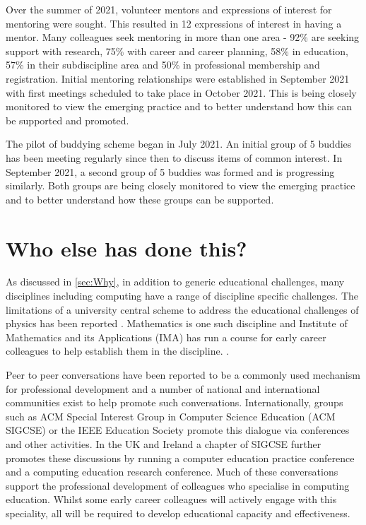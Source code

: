 \documentclass[sigconf]{acmart}
\begin{document}
Over the summer of 2021, volunteer mentors and expressions of interest for mentoring were sought. This resulted in 12 expressions of interest in having a mentor. Many colleagues seek mentoring in more than one area - 92\% are seeking support with research, 75\% with career and career planning, 58\% in education, 57\% in their subdiscipline area and 50\% in professional membership and registration. Initial mentoring relationships were established in September 2021 with first meetings scheduled to take place in October 2021. This is being closely monitored to view the emerging practice and to better understand how this can be supported and promoted.

\begin{comment}
To DO - evaluation of Buddying - PH what is needed here? Is sufficient to indicate the first pilot of 10 buddies has been established? Or do we need feedback from the participants?
\end{comment}

The pilot of buddying scheme began in July 2021. An initial group of 5 buddies has been meeting regularly since then to discuss items of common interest. In September 2021, a second group of 5 buddies was formed and is progressing similarly. Both groups are being closely monitored to view the emerging practice and to better understand how these groups can be supported.


\section{Who else has done this?}
As discussed in \ref{sec:Why}, in addition to generic educational challenges, many disciplines including computing have a range of discipline specific challenges. The limitations of a university central scheme to address the educational challenges of physics has been reported \cite{Magueijo2009}.  Mathematics is one such discipline and Institute of Mathematics and its Applications (IMA) has run a course for early career colleagues to help establish them in the discipline. \cite{IMA}.  

Peer to peer conversations have been reported to be a commonly used mechanism for professional development\cite{King2004} and a number of national and international communities exist to help promote such conversations. Internationally, groups such as ACM Special Interest Group in Computer Science Education (ACM SIGCSE) or the IEEE Education Society promote this dialogue via conferences and other activities.  In the UK and Ireland a chapter of SIGCSE further promotes these discussions by running a computer education practice conference and a computing education research conference. Much of these conversations support the professional development of colleagues who specialise in computing education. Whilst some early career colleagues will actively engage with this speciality, all will be required to develop educational capacity and effectiveness.
 
\end{document}
